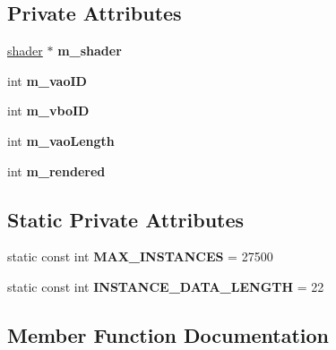 \subsection*{Private Attributes}
\begin{DoxyCompactItemize}
\item 
\mbox{\label{classflounder_1_1rendererparticles_a77de9ccc8798d572efef6ccdbc6fa938}} 
\hyperlink{classflounder_1_1shader}{shader} $\ast$ {\bfseries m\+\_\+shader}
\item 
\mbox{\label{classflounder_1_1rendererparticles_aedb9254f634d4d4bc9a130fce49d3552}} 
int {\bfseries m\+\_\+vao\+ID}
\item 
\mbox{\label{classflounder_1_1rendererparticles_ae54daaabb4c5078bd30d99e0b1da3e1a}} 
int {\bfseries m\+\_\+vbo\+ID}
\item 
\mbox{\label{classflounder_1_1rendererparticles_a5952934c9edbf7a63de0eedafe92287a}} 
int {\bfseries m\+\_\+vao\+Length}
\item 
\mbox{\label{classflounder_1_1rendererparticles_aeec5b7a516b2e997bbeb307d48c22006}} 
int {\bfseries m\+\_\+rendered}
\end{DoxyCompactItemize}
\subsection*{Static Private Attributes}
\begin{DoxyCompactItemize}
\item 
\mbox{\label{classflounder_1_1rendererparticles_a6c97f6a37becd0f75a9a2bda55e4fb01}} 
static const int {\bfseries M\+A\+X\+\_\+\+I\+N\+S\+T\+A\+N\+C\+ES} = 27500
\item 
\mbox{\label{classflounder_1_1rendererparticles_a37cde3dee7756211ce712443a3b80703}} 
static const int {\bfseries I\+N\+S\+T\+A\+N\+C\+E\+\_\+\+D\+A\+T\+A\+\_\+\+L\+E\+N\+G\+TH} = 22
\end{DoxyCompactItemize}


\subsection{Member Function Documentation}
\mbox{\label{classflounder_1_1rendererparticles_a6e91dff06e264e9b6140225d6bfa1ce6}} 

